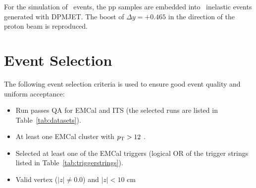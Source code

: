 For the simulation of \pPb~events, the pp samples are embedded into \pPb~inelastic events generated with \textsc{DPMJET}. The boost of $\Delta y=+0.465$ in the direction of the proton beam is reproduced. %


   


\section{Event Selection}
\label{sec:eventselection}
The following event selection criteria is used to ensure good event quality and uniform acceptance:
\begin{itemize}
\item Run passes QA for EMCal and ITS (the selected runs are listed in Table~\ref{tab:datasets}).
\item At least one EMCal cluster with $p_{\mathrm{T}}>12$ \GeVc.
\item Selected at least one of the EMCal triggers (logical OR of the trigger strings listed in Table~\ref{tab:triggerstrings}).  %
\item Valid vertex ($|z|\neq0.0$) and $|z|<10$ cm 
\end{itemize}

